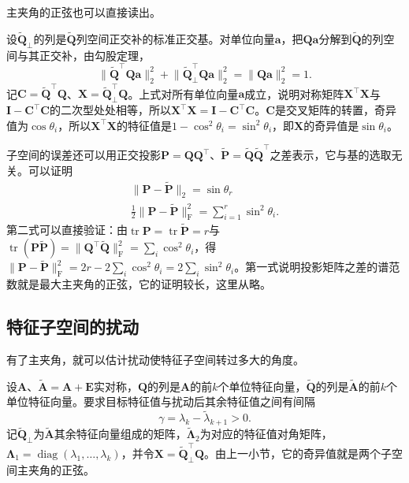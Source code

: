 主夹角的正弦也可以直接读出。

设$\widetilde{\bm Q}_\perp$的列是$\widetilde{\bm Q}$列空间正交补的标准正交基。对单位向量$\bm a$，把$\bm Q\bm a$分解到$\widetilde{\bm Q}$的列空间与其正交补，由勾股定理，
\[
 \lVert\widetilde{\bm Q}^\top\bm Q\bm a\rVert_2^2+\lVert\widetilde{\bm Q}_\perp^\top\bm Q\bm a\rVert_2^2=\lVert\bm Q\bm a\rVert_2^2=1 .
\]
记$\bm C=\widetilde{\bm Q}^\top\bm Q$、$\bm X=\widetilde{\bm Q}_\perp^\top\bm Q$。上式对所有单位向量$\bm a$成立，说明对称矩阵$\bm X^\top\bm X$与$\bm I-\bm C^\top\bm C$的二次型处处相等，所以$\bm X^\top\bm X=\bm I-\bm C^\top\bm C$。$\bm C$是交叉矩阵的转置，奇异值为$\cos\theta_i$，所以$\bm X^\top\bm X$的特征值是$1-\cos^2\theta_i=\sin^2\theta_i$，即$\bm X$的奇异值是$\sin\theta_i$。

子空间的误差还可以用正交投影$\bm P=\bm Q\bm Q^\top$、$\widetilde{\bm P}=\widetilde{\bm Q}\widetilde{\bm Q}^\top$之差表示，它与基的选取无关。可以证明
\[
 \begin{gathered}
\lVert\bm P-\widetilde{\bm P}\rVert_2=\sin\theta_r\\
\tfrac12\lVert\bm P-\widetilde{\bm P}\rVert_{\mathrm F}^2=\sum_{i=1}^r\sin^2\theta_i .
 \end{gathered}
\]
第二式可以直接验证：由$\operatorname{tr}\bm P=\operatorname{tr}\widetilde{\bm P}=r$与$\operatorname{tr}(\bm P\widetilde{\bm P})=\lVert\bm Q^\top\widetilde{\bm Q}\rVert_{\mathrm F}^2=\sum_i\cos^2\theta_i$，得$\lVert\bm P-\widetilde{\bm P}\rVert_{\mathrm F}^2=2r-2\sum_i\cos^2\theta_i=2\sum_i\sin^2\theta_i$。第一式说明投影矩阵之差的谱范数就是最大主夹角的正弦，它的证明较长，这里从略。

\subsection{特征子空间的扰动}

有了主夹角，就可以估计扰动使特征子空间转过多大的角度。

设$\bm A$、$\widetilde{\bm A}=\bm A+\bm E$实对称，$\bm Q$的列是$\bm A$的前$k$个单位特征向量，$\widetilde{\bm Q}$的列是$\widetilde{\bm A}$的前$k$个单位特征向量。要求目标特征值与扰动后其余特征值之间有间隔
\[
 \gamma=\lambda_k-\widetilde\lambda_{k+1}>0 .
\]
记$\widetilde{\bm Q}_\perp$为$\widetilde{\bm A}$其余特征向量组成的矩阵，$\widetilde{\bm\Lambda}_2$为对应的特征值对角矩阵，$\bm\Lambda_1=\operatorname{diag}(\lambda_1,\ldots,\lambda_k)$，并令$\bm X=\widetilde{\bm Q}_\perp^\top\bm Q$。由上一小节，它的奇异值就是两个子空间主夹角的正弦。

